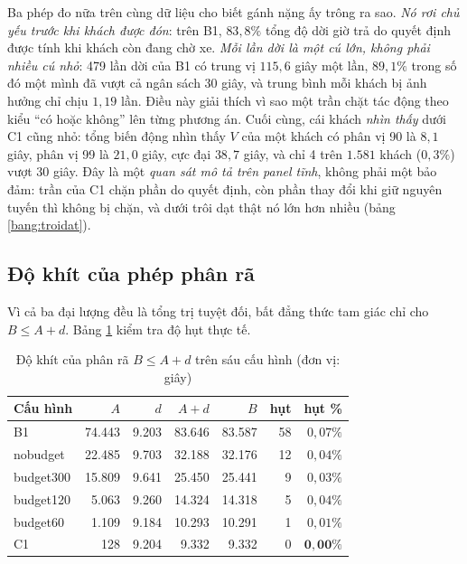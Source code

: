 Ba phép đo nữa trên cùng dữ liệu cho biết gánh nặng ấy trông ra sao. \emph{Nó rơi chủ yếu trước khi
khách được đón}: trên B1, $83{,}8\%$ tổng độ dời giờ trả do quyết định được tính khi khách còn đang
chờ xe. \emph{Mỗi lần dời là một cú lớn, không phải nhiều cú nhỏ}: 479 lần dời của B1 có trung vị
$115{,}6$ giây một lần, $89{,}1\%$ trong số đó một mình đã vượt cả ngân sách 30 giây, và trung bình
mỗi khách bị ảnh hưởng chỉ chịu $1{,}19$ lần. Điều này giải thích vì sao một trần chặt tác động theo
kiểu ``có hoặc không'' lên từng phương án. Cuối cùng, cái khách \emph{nhìn thấy} dưới C1 cũng nhỏ:
tổng biến động nhìn thấy $V$ của một khách có phân vị 90 là $8{,}1$ giây, phân vị 99 là $21{,}0$
giây, cực đại $38{,}7$ giây, và chỉ 4 trên $1.581$ khách ($0{,}3\%$) vượt 30 giây. Đây là một
\emph{quan sát mô tả trên panel tĩnh}, không phải một bảo đảm: trần của C1 chặn phần do quyết định,
còn phần thay đổi khi giữ nguyên tuyến thì không bị chặn, và dưới trôi dạt thật nó lớn hơn nhiều
(bảng \ref{bang:troidat}).

\subsection{Độ khít của phép phân rã}

Vì cả ba đại lượng đều là tổng trị tuyệt đối, bất đẳng thức tam giác chỉ cho $B \le A + d$.
Bảng \ref{bang:cong-khit} kiểm tra độ hụt thực tế.

\begin{table}[htbp]
\centering
\caption{Độ khít của phân rã $B \le A + d$ trên sáu cấu hình (đơn vị: giây)}
\label{bang:cong-khit}
\small
\begin{tabular}{@{}lrrrrrr@{}}
\toprule
\textbf{Cấu hình} & $A$ & $d$ & $A+d$ & $B$ & \textbf{hụt} & \textbf{hụt \%}\\
\midrule
B1 & 74.443 & 9.203 & 83.646 & 83.587 & 58 & $0{,}07\%$\\
nobudget & 22.485 & 9.703 & 32.188 & 32.176 & 12 & $0{,}04\%$\\
budget300 & 15.809 & 9.641 & 25.450 & 25.441 & 9 & $0{,}03\%$\\
budget120 & 5.063 & 9.260 & 14.324 & 14.318 & 5 & $0{,}04\%$\\
budget60 & 1.109 & 9.184 & 10.293 & 10.291 & 1 & $0{,}01\%$\\
C1 & 128 & 9.204 & 9.332 & 9.332 & 0 & $\mathbf{0{,}00\%}$\\
\bottomrule
\end{tabular}
\end{table}

